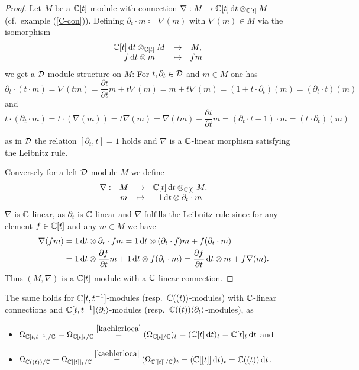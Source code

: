 \begin{proof}
Let $M$ be a $\mathbb{C}[t]$-module with connection $\nabla: M \to \mathbb{C}[t] \mathop{}\!\mathrm{d} t \otimes_{\mathbb{C}[t]} M$ (cf.\ example (\ref{C-con})). Defining $\partial_t \cdot m \coloneqq \nabla(m)$ with $\nabla(m) \in M$ via the isomorphism \[ \begin{matrix}
    & \mathbb{C}[t] \mathop{}\!\mathrm{d} t\otimes_{\mathbb{C}[t]} M & \to & M, \\ 
    &f \mathop{}\!\mathrm{d} t \otimes m & \mapsto & fm
\end{matrix}\] we get a $\mathcal{D}$-module structure on $M$: For $t, \partial_t \in \mathcal{D}$ and $m \in M$ one has
\[
\partial_t \cdot (t \cdot m) = \nabla(tm) = \frac{\partial t}{\partial t}m + t \nabla(m) = m + t \nabla(m) = (1 + t \cdot \partial_t)(m) = (\partial_t \cdot t)(m)
\]
and 
\[
t \cdot (\partial_t \cdot m) = t \cdot (\nabla(m)) = t\nabla(m) = \nabla(tm) - \frac{\partial t}{\partial t} m = (\partial_t \cdot t -1) \cdot m = (t \cdot \partial_t) (m)
\]

as in $\mathcal{D}$ the relation $[\partial_t, t]=1$ holds and $\nabla$ is a $\mathbb{C}$-linear morphism satisfying the Leibnitz rule.

Conversely for a left $\mathcal{D}$-module $M$ we define 
\[
\begin{matrix}
\nabla: &M &\to &\mathbb{C}[t] \mathop{}\!\mathrm{d}{t} \otimes_{\mathbb{C}[t]} M. \\ 
& m & \mapsto & 1 \mathop{}\!\mathrm{d}{t} \otimes \partial_t \cdot m 
\end{matrix}
\]
$\nabla$ is $\mathbb{C}$-linear, as $\partial_t$ is $\mathbb{C}$-linear and $\nabla$ fulfills the Leibnitz rule since for any element $f \in \mathbb{C}[t]$ and any $ m \in M$ we have 
\begin{align*}
\nabla(fm)&  = 1 \mathop{}\!\mathrm{d}{t} \otimes \partial_t \cdot fm = 1 \mathop{}\!\mathrm{d}{t} \otimes (\partial_t \cdot f)m + f(\partial_t \cdot m) \\ & = 1 \mathop{}\!\mathrm{d}{t} \otimes \frac{\partial f}{\partial t}m + 1 \mathop{}\!\mathrm{d}{t} \otimes f (\partial_t\cdot m)  = \frac{\partial f}{\partial t} \mathop{}\!\mathrm{d}{t} \otimes m + f \nabla(m).
\end{align*}
Thus $(M,\nabla)$ is a $\mathbb{C}[t]$-module with a $\mathbb{C}$-linear connection.
\end{proof}

\begin{rem}
The same holds for $\mathbb{C}[t,t^{-1}]$-modules (resp.\ $\mathbb{C}((t))$-modules) with $\mathbb{C}$-linear connections and $\mathbb{C}[t,t^{-1}]\langle \partial_t \rangle$-modules (resp.\ $\mathbb{C}((t))\langle \partial_t \rangle$-modules), as
\begin{itemize}
    \item $\Omega_{\mathbb{C}[t,t^{-1}]/\mathbb{C}} = \Omega_{\mathbb{C}[t]_{t}/\mathbb{C}} \overset{\ref{kaehlerloca}}{=} (\Omega_{\mathbb{C}[t]/\mathbb{C}})_{t} = (\mathbb{C}[t] \mathop{}\!\mathrm{d}{t})_{t} = \mathbb{C}[t]_{t}\mathop{}\!\mathrm{d}{t}$ and 
    \item $\Omega_{\mathbb{C}((t))/\mathbb{C}} = \Omega_{\mathbb{C}[[t]]_{t}/\mathbb{C}} \overset{\ref{kaehlerloca}}{=} (\Omega_{\mathbb{C}[[t]]/\mathbb{C}})_{t} = (\mathbb{C}[[t]]\mathop{}\!\mathrm{d}{t})_{t} = \mathbb{C}((t)) \mathop{}\!\mathrm{d}{t}$.
\end{itemize}
\end{rem}

